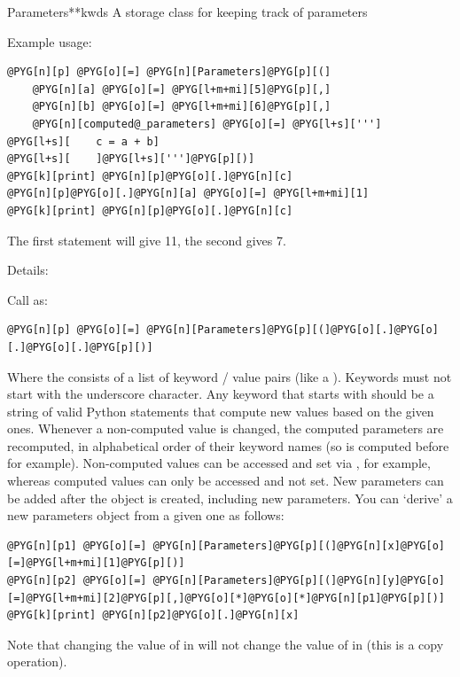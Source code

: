 \documentclass[letterpaper,10pt,english]{manual}
\begin{document}
\hypertarget{brian.Parameters}{}\begin{classdesc}{Parameters}{**kwds}
A storage class for keeping track of parameters

Example usage:

\begin{Verbatim}[commandchars=@\[\]]
@PYG[n][p] @PYG[o][=] @PYG[n][Parameters]@PYG[p][(]
    @PYG[n][a] @PYG[o][=] @PYG[l+m+mi][5]@PYG[p][,]
    @PYG[n][b] @PYG[o][=] @PYG[l+m+mi][6]@PYG[p][,]
    @PYG[n][computed@_parameters] @PYG[o][=] @PYG[l+s][''']
@PYG[l+s][    c = a + b]
@PYG[l+s][    ]@PYG[l+s][''']@PYG[p][)]
@PYG[k][print] @PYG[n][p]@PYG[o][.]@PYG[n][c]
@PYG[n][p]@PYG[o][.]@PYG[n][a] @PYG[o][=] @PYG[l+m+mi][1]
@PYG[k][print] @PYG[n][p]@PYG[o][.]@PYG[n][c]
\end{Verbatim}

The first  statement will give 11, the second gives 7.

Details:

Call as:

\begin{Verbatim}[commandchars=@\[\]]
@PYG[n][p] @PYG[o][=] @PYG[n][Parameters]@PYG[p][(]@PYG[o][.]@PYG[o][.]@PYG[o][.]@PYG[p][)]
\end{Verbatim}

Where the  consists of a list of keyword / value pairs (like a ).
Keywords must not start with the underscore \code{\_} character. Any
keyword that starts with  should be a string of valid Python statements
that compute new values based on the given ones. Whenever a non-computed value is
changed, the computed parameters are recomputed, in alphabetical order of their
keyword names (so  is computed before  for example).
Non-computed values can be accessed and set via ,  for example, whereas
computed values can only be accessed and not set. New parameters can be added
after the \hyperlink{brian.Parameters}{} object is created, including new  parameters. You
can `derive' a new parameters object from a given one as follows:

\begin{Verbatim}[commandchars=@\[\]]
@PYG[n][p1] @PYG[o][=] @PYG[n][Parameters]@PYG[p][(]@PYG[n][x]@PYG[o][=]@PYG[l+m+mi][1]@PYG[p][)]
@PYG[n][p2] @PYG[o][=] @PYG[n][Parameters]@PYG[p][(]@PYG[n][y]@PYG[o][=]@PYG[l+m+mi][2]@PYG[p][,]@PYG[o][*]@PYG[o][*]@PYG[n][p1]@PYG[p][)]
@PYG[k][print] @PYG[n][p2]@PYG[o][.]@PYG[n][x]
\end{Verbatim}

Note that changing the value of  in  will not change the value of  in  (this
is a copy operation).
\end{classdesc}
\end{document}
